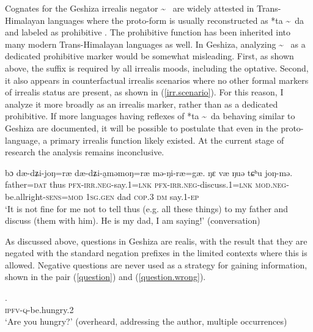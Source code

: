 \documentclass[output=paper,colorlinks,citecolor=brown]{langscibook}
\begin{document}
Cognates for the Geshiza irrealis negator  \textasciitilde \  are widely attested in Trans-Himalayan languages where the proto-form is usually reconstructed as {*ta} \textasciitilde \ {da} and labeled as prohibitive \citep [see][586]{Matisoff2003}. The prohibitive function has been inherited into many modern Trans-Himalayan languages as well. In Geshiza, analyzing   \textasciitilde \  as a dedicated prohibitive marker would be somewhat misleading. First, as shown above, the  suffix is required by all irrealis moods, including the optative. Second, it also appears in counterfactual irrealis scenarios where no other formal markers of irrealis status are present, as shown in (\ref{irr.scenario}). For this reason, I analyze it more broadly as an irrealis marker, rather than as a dedicated prohibitive. If more languages having reflexes of {*ta} \textasciitilde \ {da} behaving similar to Geshiza are documented, it will be possible to postulate that even in the proto-language, a primary irrealis function likely existed. At the current stage of research the analysis remains inconclusive.


\ea
\label{irr.scenario}
     {bɔ} 	{dæ-dʑi-joŋ=ræ} 	{dæ-dʑi-a̯məmoŋ=ræ} {mə-ŋi-ræ=gæ}. 		{ŋɛ}			{væ} 		{ŋuə} 	{tɕʰu} 	{joŋ-mə.} \\  
     father=\textsc{dat}  thus   \textsc{pfx}-\textsc{irr.neg}-say.1=\textsc{lnk} \textsc{pfx}-\textsc{irr.neg}-discuss.1=\textsc{lnk} \textsc{mod.neg}-be.allright-\textsc{sens}=\textsc{mod}
     \textsc{1sg.gen}   dad \textsc{cop}.3 \textsc{dm}	say.1-\textsc{ep}\\ 
\glt `It is not fine for me not to tell thus (e.g. all these things) to my father and discuss (them with him). He is my dad, I am saying!' (conversation) 
\z

As discussed above, questions in Geshiza are realis, with the result that they are negated with the standard negation prefixes in the limited contexts where this is allowed. Negative questions are never used as a strategy for gaining information, shown in the pair (\ref{question}) and (\ref{question.wrong}). 

\ea
\label{question}
.\\  
      \textsc{ipfv}-\textsc{q}-be.hungry.2\\ 
\glt `Are you hungry?' (overheard, addressing the author, multiple occurrences)
\z

\z
\end{document}
